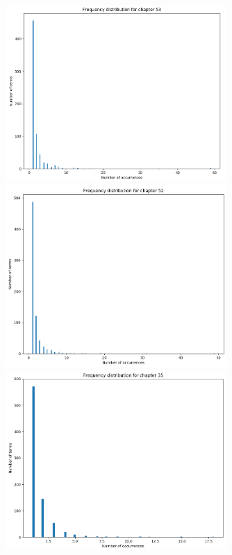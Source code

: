 \documentclass{article}
\begin{document}
\begin{flushleft}
\begin{figure}[H]
\begin{minipage}{0.45\linewidth}
			\includegraphics[width=0.75\textwidth]{./images/7-chapter_wise-frequency.png}
			\includegraphics[width=0.75\textwidth]{./images/8-chapter_wise-frequency.png}
			\includegraphics[width=0.75\textwidth]{./images/9-chapter_wise-frequency.png}

\end{minipage}
\end{figure}
\end{flushleft}
\end{document}
